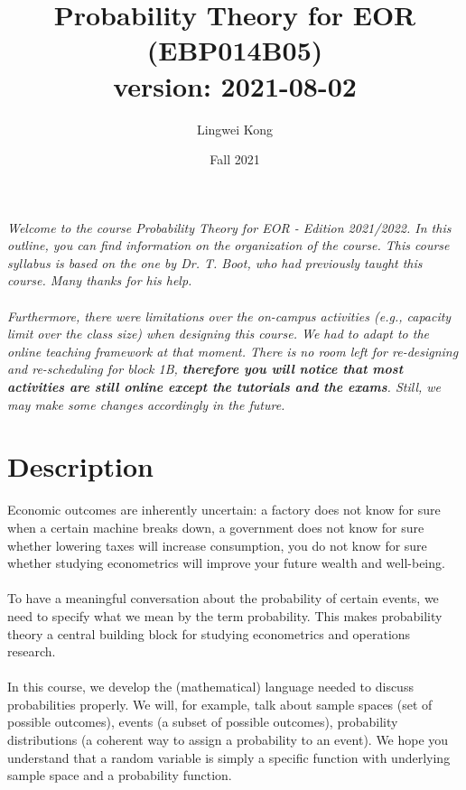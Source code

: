 \documentclass[openany]{article}
\title{Probability Theory for EOR (EBP014B05)\\
version: 2021-08-02}
\date{ Fall 2021}
\author{Lingwei Kong}
\begin{document}
\maketitle\thispagestyle{empty}
\textit{Welcome to the course Probability Theory for EOR - Edition 2021/2022. In
	this outline, you can find information on the organization of the course. This course syllabus is based on the one by Dr. T. Boot, who had previously taught this course. Many thanks for his help.\\~\\
	 Furthermore, there were limitations over the on-campus activities (e.g., capacity limit over the class size) when designing this course. We had to adapt to the online teaching framework at that moment. There is no room left for re-designing and re-scheduling for block 1B, \textbf{therefore you will notice that most activities are still online except the tutorials and the exams}. Still, we may make some changes accordingly in the future.} 
 \tableofcontents
 
 
 \newpage
\section{Description}
Economic outcomes are inherently uncertain: a factory does not know for
sure when a certain machine breaks down, a government does not know
for sure whether lowering taxes will increase consumption, you do not know
for sure whether studying econometrics will improve your future wealth and
well-being.\\~\\
To have a meaningful conversation about the probability of
certain events, we need to specify what we mean by the term probability. This makes probability theory a central building block for studying econometrics and operations research.\\~\\
In this course, we develop the (mathematical) language needed to discuss probabilities properly. We will, for example, talk about sample spaces (set
of possible outcomes), events (a subset of possible outcomes), probability distributions (a coherent way to assign a probability to an event). We hope you understand that a random variable is simply a specific function with underlying sample space and a probability function. 
\end{document}
